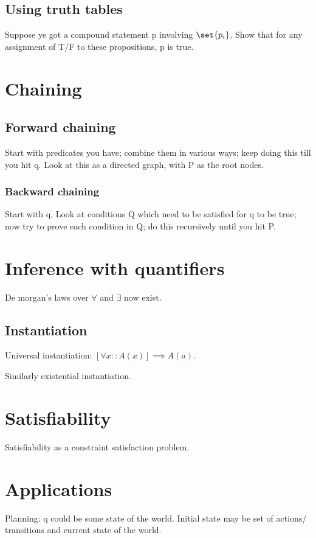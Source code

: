 \documentclass[oneside, article]{memoir}
\begin{document}
\subsection{Using truth tables}
Suppose ye got a compound statement p involving $\set{p_i}$. Show that for any assignment of T/F to these propositions, p is true.

\section{Chaining}
\subsection{Forward chaining}
Start with predicates you have; combine them in various ways; keep doing this till you hit q. Look at this as a directed graph, with P as the root nodes.

\subsubsection{Backward chaining}
Start with q. Look at conditions Q which need to be satisfied for q to be true; now try to prove each condition in Q; do this recursively until you hit P.

\section{Inference with quantifiers}
De morgan's laws over $\forall$ and $\exists$ now exist.

\subsection{Instantiation}
Universal instantiation: $[\forall x :: A(x)] \implies A(a)$.

Similarly existential instantiation.

\section{Satisfiability}
Satisfiability as a constraint satisfaction problem. \tbc

\section{Applications}
Planning: q could be some state of the world. Initial state may be set of actions/ transitions and current state of the world.
\end{document}
